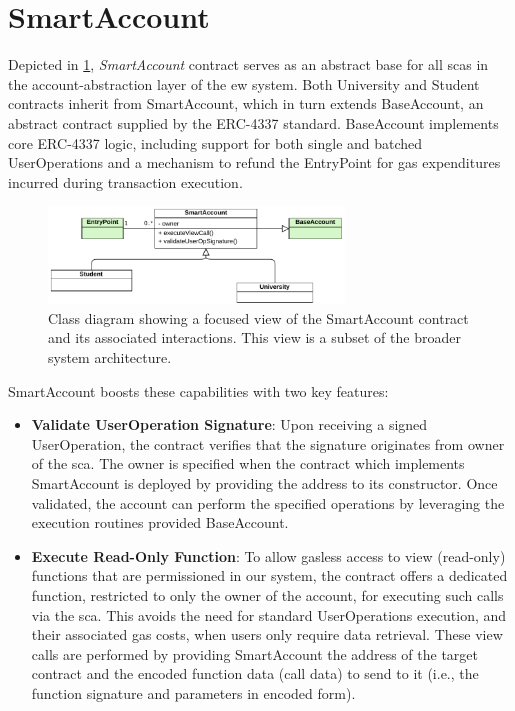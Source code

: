 \section{SmartAccount}
\label{sec:smartAccountDesign}
Depicted in \cref{fig:smartAccountContractClass}, \textit{SmartAccount} contract serves as an abstract base for all \acrlong{sca}s in the account-abstraction layer of the \acrlong{ew} system. Both University and Student contracts inherit from SmartAccount, which in turn extends BaseAccount, an abstract contract supplied by the ERC-4337 standard. BaseAccount implements core ERC-4337 logic, including support for both single and batched UserOperations and a mechanism to refund the EntryPoint for gas expenditures incurred during transaction execution.

\begin{figure}
  \centering
  \includegraphics[width=0.7\textwidth]{figures/SmartAccount class diagram.pdf}
  \caption[Class diagram focused on SmartAccount contract]{Class diagram showing a focused view of the SmartAccount contract and its associated interactions. This view is a subset of the broader system architecture.}
  \label{fig:smartAccountContractClass}
\end{figure}

SmartAccount boosts these capabilities with two key features:
\begin{itemize}
    \item \textbf{Validate UserOperation Signature}: Upon receiving a signed UserOperation, the contract verifies that the signature originates from owner of the \acrshort{sca}. The owner is specified when the contract which implements SmartAccount is deployed by providing the address to its constructor. Once validated, the account can perform the specified operations by leveraging the execution routines provided BaseAccount.
    \item \textbf{Execute Read-Only Function}: To allow gasless access to view (read-only) functions that are permissioned in our system, the contract offers a dedicated function, restricted to only the owner of the account, for executing such calls via the \acrshort{sca}. This avoids the need for standard UserOperations execution, and their associated gas costs, when users only require data retrieval. These view calls are performed by providing SmartAccount the address of the target contract and the encoded function data (call data) to send to it (i.e., the function signature and parameters in encoded form).
\end{itemize}

